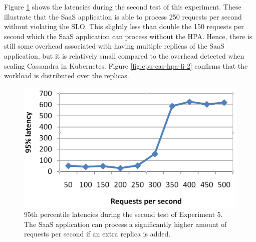 \newpage

Figure \ref{fig:lat-saas-hpa-li} shows the latencies during the second test of this experiment. These illustrate that the SaaS application is able to process 250 requests per second without violating the SLO. This slightly less than double the 150 requests per second which the SaaS application can process without the HPA. Hence, there is still some overhead associated with having multiple replicas of the SaaS application, but it is relatively small compared to the overhead detected when scaling Cassandra in Kubernetes. Figure \ref{fig:cpu-cas-hpa-li-2} confirms that the workload is distributed over the replicas.

\begin{figure}
\centering
\includegraphics[width=0.60\columnwidth]{Images/Experiments/CPU/Latencies/lat-saas-hpa-li.PNG}
\caption{95th percentile latencies during the second test of Experiment 5. The SaaS application can process a significantly higher amount of requests per second if an extra replica is added.}
\label{fig:lat-saas-hpa-li}
\end{figure}


